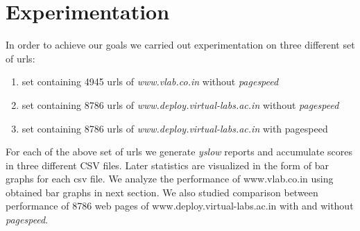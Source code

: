 \documentclass[conference]{IEEEtran}
\begin{document}
\section{Experimentation}\label{sec-5}
In order to achieve our goals we carried out experimentation on three different set of urls:
\begin{enumerate}
 \item set containing 4945 urls of {\it www.vlab.co.in} without {\it pagespeed}
 \item set containing 8786 urls of {\it www.deploy.virtual-labs.ac.in} without {\it pagespeed}
 \item set containing 8786 urls of {\it www.deploy.virtual-labs.ac.in} with pagespeed
\end{enumerate}
For each of the above set of urls we generate {\it yslow} reports and accumulate scores
in three different CSV files. Later statistics are visualized in the form of bar graphs for each csv file.
We analyze the performance of www.vlab.co.in using obtained bar graphs in next section.
We also studied comparison between performance of 8786 web pages of www.deploy.virtual-labs.ac.in
with and without {\it pagespeed}.

% 
% 
\end{document}
